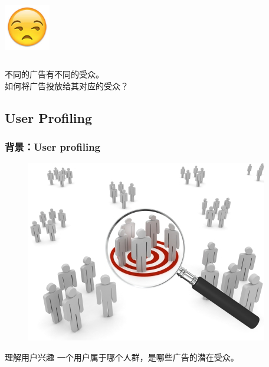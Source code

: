\documentclass{beamer}
\begin{document}
\begin{frame}
\begin{columns}[T]
\begin{column}{.5\textwidth}
\begin{center}
      \end{center}
      \begin{center}
      \includegraphics[width=0.15\textwidth]{img/emoji_unamused.png}
      \end{center}
    \end{column}
  \end{columns}

  \pause

  \begin{block}{}
   不同的广告有不同的受众。\\
   如何将广告投放给其对应的受众？
  \end{block}

\end{frame}

\subsection{User Profiling}

\begin{frame}
\frametitle{背景：User profiling}
\begin{figure}
\includegraphics[width=.6\linewidth]{img/target_market.png}
\end{figure}
\begin{block}{理解用户兴趣}
一个用户属于哪个人群，是哪些广告的潜在受众。
\end{block}
\end{frame}
\end{document}
